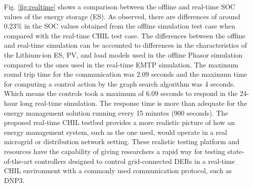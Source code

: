 Fig. \ref{fig:realtime} shows a comparison between the offline and real-time SOC values of the energy storage (ES). As observed, there are differences of around 0.23\%  in the SOC values obtained from the offline simulation test case when compared with the real-time CHIL test case. The differences between the offline and real-time simulation can be accounted to differences in the characteristics of the Lithium-ion ES, PV, and load models used in the offline Phasor simulation compared to the ones used in the real-time EMTP simulation. The maximum round trip time for the communication was 2.09 seconds and the maximum time for computing a control action by the graph search algorithm was 4 seconds. Which means the controls took a maximum of 6.09 seconds to respond in the 24-hour long real-time simulation. The response time is more than adequate for the energy management solution running every 15 minutes (900 seconds). The proposed real-time CHIL testbed provides a more realistic picture of how an energy management system, such as the one used, would operate in a real microgrid or distribution network setting. These realistic testing platform and resources have the capability of giving researchers a rapid way for testing state-of-the-art controllers designed to control grid-connected DERs in a real-time CHIL environment with a commonly used communication protocol, such as DNP3.


 



